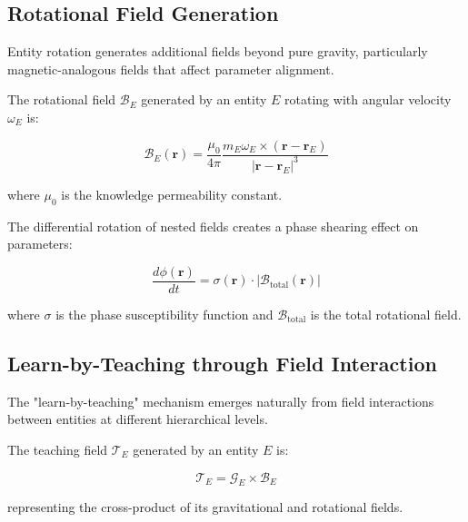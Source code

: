 \subsection{Rotational Field Generation}

Entity rotation generates additional fields beyond pure gravity, particularly magnetic-analogous fields that affect parameter alignment.

\begin{definition}
The rotational field $\mathcal{B}_E$ generated by an entity $E$ rotating with angular velocity $\omega_E$ is:

\begin{equation}
\mathcal{B}_E(\mathbf{r}) = \frac{\mu_0}{4\pi} \frac{m_E \omega_E \times (\mathbf{r} - \mathbf{r}_E)}{|\mathbf{r} - \mathbf{r}_E|^3}
\end{equation}

where $\mu_0$ is the knowledge permeability constant.
\end{definition}

\begin{theorem}
The differential rotation of nested fields creates a phase shearing effect on parameters:

\begin{equation}
\frac{d\phi(\mathbf{r})}{dt} = \sigma(\mathbf{r}) \cdot |\mathcal{B}_{\text{total}}(\mathbf{r})|
\end{equation}

where $\sigma$ is the phase susceptibility function and $\mathcal{B}_{\text{total}}$ is the total rotational field.
\end{theorem}

\subsection{Learn-by-Teaching through Field Interaction}

The "learn-by-teaching" mechanism emerges naturally from field interactions between entities at different hierarchical levels.

\begin{definition}
The teaching field $\mathcal{T}_E$ generated by an entity $E$ is:

\begin{equation}
\mathcal{T}_E = \mathcal{G}_E \times \mathcal{B}_E
\end{equation}

representing the cross-product of its gravitational and rotational fields.
\end{definition}

